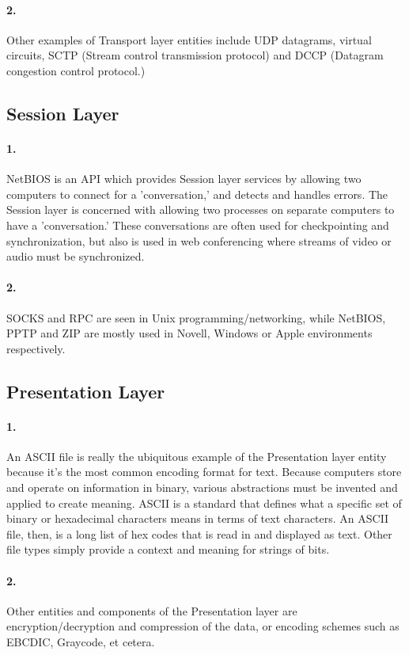 \documentclass[11pt]{article}
\begin{document}
\paragraph{2.}
Other examples of Transport layer entities include UDP datagrams, virtual circuits, SCTP (Stream control transmission protocol) and DCCP (Datagram congestion control protocol.)

\subsection{Session Layer}
\paragraph{1.}
NetBIOS is an API which provides Session layer services by allowing two computers to connect for a 'conversation,' and detects and handles errors. The Session layer is concerned with allowing two processes on separate computers to have a 'conversation.' These conversations are often used for checkpointing and synchronization, but also is used in web conferencing where streams of video or audio must be synchronized.
\paragraph{2.}
SOCKS and RPC are seen in Unix programming/networking, while NetBIOS, PPTP and ZIP are mostly used in Novell, Windows or Apple environments respectively. 

\subsection{Presentation Layer}
\paragraph{1.}
An ASCII file is really the ubiquitous example of the Presentation layer entity because it's the most common encoding format for text. Because computers store and operate on information in binary, various abstractions must be invented and applied to create meaning. ASCII is a standard that defines what a specific set of binary or hexadecimal characters means in terms of text characters. An ASCII file, then, is a long list of hex codes that is read in and displayed as text. Other file types simply provide a context and meaning for strings of bits.
\paragraph{2.}
Other entities and components of the Presentation layer are encryption/decryption and compression of the data, or encoding schemes such as EBCDIC, Graycode, et cetera.
\end{document}
